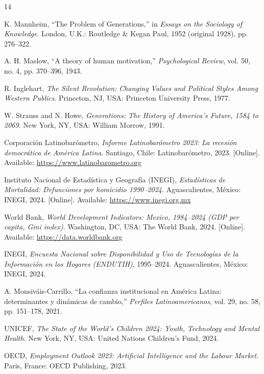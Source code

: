 \documentclass[conference,spanish]{IEEEtran}
\begin{document}
\begin{thebibliography}{14}

K. Mannheim, ``The Problem of Generations,'' in \textit{Essays on the Sociology of Knowledge}. London, U.K.: Routledge \& Kegan Paul, 1952 (original 1928), pp. 276--322.

A. H. Maslow, ``A theory of human motivation,'' \textit{Psychological Review}, vol. 50, no. 4, pp. 370--396, 1943.

R. Inglehart, \textit{The Silent Revolution: Changing Values and Political Styles Among Western Publics}. Princeton, NJ, USA: Princeton University Press, 1977.

W. Strauss and N. Howe, \textit{Generations: The History of America's Future, 1584 to 2069}. New York, NY, USA: William Morrow, 1991.

Corporación Latinobarómetro, \textit{Informe Latinobarómetro 2023: La recesión democrática de América Latina}. Santiago, Chile: Latinobarómetro, 2023. [Online]. Available: \url{https://www.latinobarometro.org}

Instituto Nacional de Estadística y Geografía (INEGI), \textit{Estadísticas de Mortalidad: Defunciones por homicidio 1990--2024}. Aguascalientes, México: INEGI, 2024. [Online]. Available: \url{https://www.inegi.org.mx}

World Bank, \textit{World Development Indicators: Mexico, 1984--2024 (GDP per capita, Gini index)}. Washington, DC, USA: The World Bank, 2024. [Online]. Available: \url{https://data.worldbank.org}

INEGI, \textit{Encuesta Nacional sobre Disponibilidad y Uso de Tecnologías de la Información en los Hogares (ENDUTIH)}, 1995--2024. Aguascalientes, México: INEGI, 2024.

A. Monsiváis-Carrillo, ``La confianza institucional en América Latina: determinantes y dinámicas de cambio,'' \textit{Perfiles Latinoamericanos}, vol. 29, no. 58, pp. 151--178, 2021.

UNICEF, \textit{The State of the World's Children 2024: Youth, Technology and Mental Health}. New York, NY, USA: United Nations Children's Fund, 2024.

OECD, \textit{Employment Outlook 2023: Artificial Intelligence and the Labour Market}. Paris, France: OECD Publishing, 2023.


\end{thebibliography}
\end{document}
